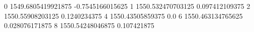 0 1549.6805419921875 -0.7545166015625
1 1550.532470703125 0.097412109375
2 1550.55908203125 0.1240234375
4 1550.43505859375 0.0
6 1550.463134765625 0.028076171875
8 1550.54248046875 0.107421875
